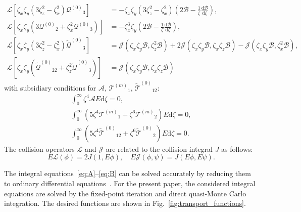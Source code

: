\documentclass[review]{elsarticle}
\newcommand{\dd}{\mathrm{d}}
\newcommand{\der}[2][]{\frac{\dd#1}{\dd#2}}
\newcommand{\Q}{\ensuremath{\mathcal{Q}^{(0)}}}
\newcommand{\T}[1]{\ensuremath{\mathcal{T}^{(#1)}}}
\newcommand{\TT}{\ensuremath{\tilde{\mathcal{T}}^{(0)}}}
\newcommand{\QQ}{\ensuremath{\tilde{\mathcal{Q}}^{(0)}}}
\begin{document}
\begin{align}
    \mathcal{L}\left[ \zeta_x\zeta_y \left( 3\zeta_z^2-\zeta_x^2 \right)\Q_3 \right]
        &= -\zeta_x\zeta_y\left( 3\zeta_z^2-\zeta_x^2 \right)\left(2\mathcal{B} - \frac1\zeta\der[\mathcal{B}]{\zeta}\right), \label{eq:Q3}\\
    \mathcal{L}\left[ \zeta_x\zeta_y \left( 3\Q_2+\zeta_x^2\Q_3 \right) \right]
        &= -\zeta_x^3\zeta_y\left(2\mathcal{B} - \frac1\zeta\der[\mathcal{B}]{\zeta}\right), \label{eq:Q2}\\
    \mathcal{L}\left[ \zeta_x\zeta_y\left( 3\zeta_z^2 - \zeta_x^2 \right)\QQ_3 \right]
        &= \mathcal{J}\left( \zeta_x\zeta_y\mathcal{B}, \zeta_z^2\mathcal{B} \right)
        + 2\mathcal{J}\left( \zeta_x\zeta_y\mathcal{B}, \zeta_x\zeta_z\mathcal{B} \right)
        - \mathcal{J}\left( \zeta_x\zeta_y\mathcal{B}, \zeta_x^2\mathcal{B} \right), \label{eq:QQ3}\\
    \mathcal{L}\left[ \zeta_x\zeta_y \left( \QQ_{22} + \zeta_z^2\QQ_3 \right) \right]
        &= \mathcal{J}\left( \zeta_x\zeta_y\mathcal{B}, \zeta_x\zeta_z\mathcal{B} \right) \label{eq:QQ2}
\end{align}
with subsidiary conditions for \(\mathcal{A}\), \(\T{m}_1\), \(\TT_{12}\):
\begin{gather}
    \int_0^\infty \zeta^4 \mathcal{A} E \dd\zeta = 0, \label{eq:A_constraint}\\
    \int_0^\infty \left( 5\zeta^4\T{m}_1 + \zeta^6\T{m}_2 \right) E \dd\zeta = 0, \label{eq:Tm_constraint}\\
    \int_0^\infty \left( 5\zeta^4\TT_{12} + \zeta^6\TT_2 \right) E \dd\zeta = 0. \label{eq:T12_constraint}
\end{gather}
The collision operators \(\mathcal{L}\) and \(\mathcal{J}\) are related to the collision integral \(J\) as follows:
\begin{equation}\label{eq:mathcalLJ}
    E\mathcal{L}(\phi) = 2J(1, E\phi), \quad E\mathcal{J}(\phi, \psi) = J(E\phi, E\psi).
\end{equation}

The integral equations~\eqref{eq:A}--\eqref{eq:B} can be solved accurately
by reducing them to ordinary differential equations~\citep[see e.g.][]{Pekeris1957, Ohwada1992}.
For the present paper, the considered integral equations are solved
by the fixed-point iteration and direct quasi-Monte Carlo integration.
The desired functions are shown in Fig.~\ref{fig:transport_functions}.
\end{document}
